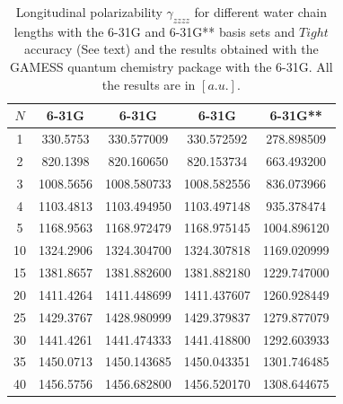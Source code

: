 \documentclass[twocolumn,showpacs,preprintnumbers,amsmath,amssymb]{revtex4}
\begin{document}



\begin{table}
  \centering
  \caption{\protect
    Longitudinal polarizability $\gamma_{zzzz}$
    for different water chain lengths with the 6-31G and 6-31G** basis sets
    and $Tight$ accuracy (See text) and the results obtained with
    the GAMESS quantum chemistry package \cite{gamess} with the 6-31G. 
    All the results are in $[a.u.]$.
  }\label{tab:Polari_1D_Values}
  \begin{ruledtabular}
    \begin{tabular}{ccccc}
      $N$ &\multicolumn{1}{c}{6-31G\footnotemark[1]}
      &\multicolumn{1}{c}{6-31G\footnotemark[2]}
      &\multicolumn{1}{c}{6-31G\footnotemark[2]\footnotemark[3]}
      &\multicolumn{1}{c}{6-31G**\footnotemark[2]}\\
      \hline
      1 &  330.5753 &  330.577009 &  330.572592 &  278.898509 \\
      2 &  820.1398 &  820.160650 &  820.153734 &  663.493200 \\
      3 & 1008.5656 & 1008.580733 & 1008.582556 &  836.073966 \\
      4 & 1103.4813 & 1103.494950 & 1103.497148 &  935.378474 \\
      5 & 1168.9563 & 1168.972479 & 1168.975145 & 1004.896120 \\
     10 & 1324.2906 & 1324.304700 & 1324.307818 & 1169.020999 \\
     15 & 1381.8657 & 1381.882600 & 1381.882180 & 1229.747000 \\
     20 & 1411.4264 & 1411.448699 & 1411.437607 & 1260.928449 \\
     25 & 1429.3767 & 1428.980999 & 1429.379837 & 1279.877079 \\
     30 & 1441.4261 & 1441.474333 & 1441.418800 & 1292.603933 \\
     35 & 1450.0713 & 1450.143685 & 1450.043351 & 1301.746485 \\
     40 & 1456.5756 & 1456.682800 & 1456.520170 & 1308.644675 \\
    \end{tabular}
  \end{ruledtabular}
\end{table}
\end{document}
